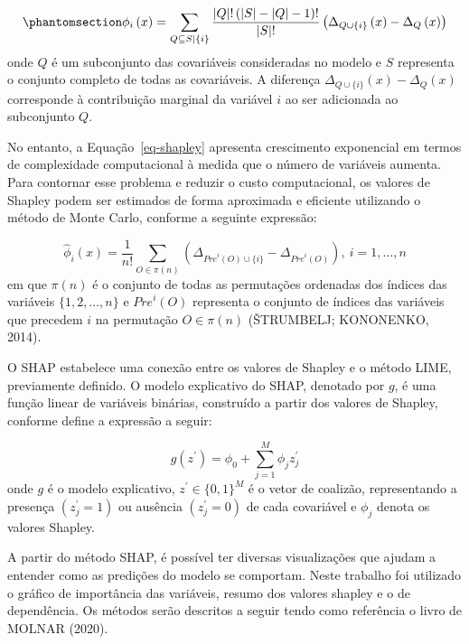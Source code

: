 \documentclass[
  12pt,
  a4paper,
]{scrreprt}
\begin{document}
\begin{equation}\phantomsection\label{eq-shapley}{
\phi_i\left(x\right) = \sum_{Q \subseteq S | \{i\}} \frac{|Q|!\left(|S| - |Q| - 1\right)!}{|S|!} \left(\Delta_{Q\cup \{i\}}\left(x\right) - \Delta_{Q}\left(x\right)\right)
}\end{equation} onde \(Q\) é um subconjunto das covariáveis consideradas
no modelo e \(S\) representa o conjunto completo de todas as
covariáveis. A diferença
\(\Delta_{Q \cup \{i\}}\left(x\right) - \Delta_{Q}\left(x\right)\)
corresponde à contribuição marginal da variável \(i\) ao ser adicionada
ao subconjunto \(Q\).

\vspace{12pt}

No entanto, a Equação~\ref{eq-shapley} apresenta crescimento exponencial
em termos de complexidade computacional à medida que o número de
variáveis aumenta. Para contornar esse problema e reduzir o custo
computacional, os valores de Shapley podem ser estimados de forma
aproximada e eficiente utilizando o método de Monte Carlo, conforme a
seguinte expressão:

\[
\hat{\phi}_{i}\left(x\right) = \frac{1}{n!} \sum_{O \in \pi \left(n \right)} \left( \Delta_{{Pre}^{i} \left(O\right) \cup \{i\}} - \Delta_{{Pre}^{i} \left(O\right)} \right), \ i = 1, \dots, n
\] em que \(\pi\left(n\right)\) é o conjunto de todas as permutações
ordenadas dos índices das variáveis \(\{1, 2, \dots, n\}\) e
\({Pre}^{i}\left(O\right)\) representa o conjunto de índices das
variáveis que precedem \(i\) na permutação \(O \in \pi \left(n\right)\)
(ŠTRUMBELJ; KONONENKO, 2014).

\vspace{12pt}

O SHAP estabelece uma conexão entre os valores de Shapley e o método
LIME, previamente definido. O modelo explicativo do SHAP, denotado por
\(g\), é uma função linear de variáveis binárias, construído a partir
dos valores de Shapley, conforme define a expressão a seguir:

\[
g\left(z^{'}\right) = \phi_0 + \sum_{j = 1}^{M} \phi_{j} z_{j}^{'}
\] onde \(g\) é o modelo explicativo, \(z^{'} \in \{0, 1\}^{M}\) é o
vetor de coalizão, representando a presença \(\left(z^{'}_j = 1\right)\)
ou ausência \(\left(z^{'}_j = 0\right)\) de cada covariável e \(\phi_j\)
denota os valores Shapley.

\vspace{12pt}

A partir do método SHAP, é possível ter diversas visualizações que
ajudam a entender como as predições do modelo se comportam. Neste
trabalho foi utilizado o gráfico de importância das variáveis, resumo
dos valores shapley e o de dependência. Os métodos serão descritos a
seguir tendo como referência o livro de MOLNAR (2020).
\end{document}
